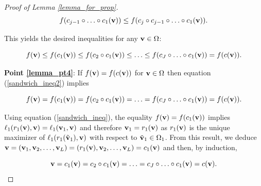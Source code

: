 \documentclass[
]{jss}
\begin{document}
\begin{proof}[Proof of Lemma \ref{lemma_for_prop}]
\begin{equation}
f(c_{j-1}\circ \ldots \circ c_1(\mathbf{v}))\leq f(c_j\circ c_{j-1}\circ \ldots \circ c_1(\mathbf{v})).
\end{equation}

This yields the desired inequalities for any $\mathbf{v}\in\Omega$:

\begin{equation}
f(\mathbf{v})\leq f(c_1(\mathbf{v}))\leq f(c_2\circ c_1(\mathbf{v})) \leq \ldots \leq f(c_J\circ \ldots \circ c_1(\mathbf{v})) = f(c(\mathbf{v})).
\label{sandwich_ineq2}
\end{equation}

\textbf{Point \ref{lemma_pt4}}:
    If $f(\mathbf{v}) = f(c(\mathbf{v}))$ for $\mathbf{v} \in \Omega$ then equation 
    (\ref{sandwich_ineq2}) implies 

\begin{equation}
f(\mathbf{v})= f(c_1(\mathbf{v}))= f(c_2\circ c_1(\mathbf{v}))=\ldots = f(c_J\circ \ldots \circ c_1(\mathbf{v})) = f(c(\mathbf{v})).
\end{equation}

Using equation (\ref{sandwich_ineq}), the equality $f(\mathbf{v}) = f(c_1(\mathbf{v}))$ 
implies $\ell_1(r_1(\mathbf{v}), \mathbf{v})=\ell_1(\mathbf{v}_1, \mathbf{v})$ and therefore 
$\mathbf{v}_1=r_1(\mathbf{v})$ as $r_1(\mathbf{v})$ is the unique maximizer of 
$\ell_1(r_1(\tilde{\mathbf{v}}_1), \mathbf{v})$ with respect to 
$\tilde{\mathbf{v}}_1 \in \Omega_1$. From this result, we deduce 
$\mathbf{v} = \left(\mathbf{v}_1, \mathbf{v}_2, \ldots, \mathbf{v}_L \right) = \left(r_1(\mathbf{v}), \mathbf{v}_2, \ldots, \mathbf{v}_L \right) = c_1(\mathbf{v})$ 
and then, by induction, 

\begin{equation}
\mathbf{v}= c_1(\mathbf{v})= c_2\circ c_1(\mathbf{v})=\ldots= c_J\circ\ldots\circ c_1(\mathbf{v}) = c(\mathbf{v}).
\end{equation}
    
\end{proof}
\end{document}
